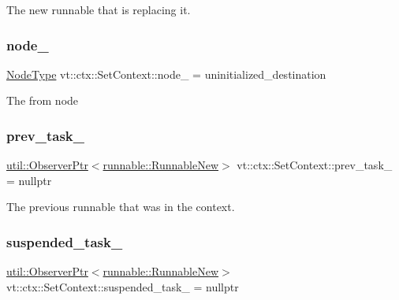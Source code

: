 The new runnable that is replacing it. 

\mbox{\label{structvt_1_1ctx_1_1_set_context_a2dbb72742d51cb57da427ab187edde74}} 
\subsubsection{\texorpdfstring{node\+\_\+}{node\_}}
{\footnotesize\ttfamily \hyperlink{namespacevt_a866da9d0efc19c0a1ce79e9e492f47e2}{Node\+Type} vt\+::ctx\+::\+Set\+Context\+::node\+\_\+ = uninitialized\+\_\+destination\hspace{0.3cm}{\ttfamily [private]}}

The from node \mbox{\label{structvt_1_1ctx_1_1_set_context_af5a9e9f7f2f7deeadd17da554e8aa39b}} 
\subsubsection{\texorpdfstring{prev\+\_\+task\+\_\+}{prev\_task\_}}
{\footnotesize\ttfamily \hyperlink{namespacevt_1_1util_a7d480434049896696b9a50c38a766202}{util\+::\+Observer\+Ptr}$<$\hyperlink{structvt_1_1runnable_1_1_runnable_new}{runnable\+::\+Runnable\+New}$>$ vt\+::ctx\+::\+Set\+Context\+::prev\+\_\+task\+\_\+ = nullptr\hspace{0.3cm}{\ttfamily [private]}}



The previous runnable that was in the context. 

\mbox{\label{structvt_1_1ctx_1_1_set_context_a6c8795c11ee73b3f29b7a5266c53817c}} 
\subsubsection{\texorpdfstring{suspended\+\_\+task\+\_\+}{suspended\_task\_}}
{\footnotesize\ttfamily \hyperlink{namespacevt_1_1util_a7d480434049896696b9a50c38a766202}{util\+::\+Observer\+Ptr}$<$\hyperlink{structvt_1_1runnable_1_1_runnable_new}{runnable\+::\+Runnable\+New}$>$ vt\+::ctx\+::\+Set\+Context\+::suspended\+\_\+task\+\_\+ = nullptr\hspace{0.3cm}{\ttfamily [private]}}



